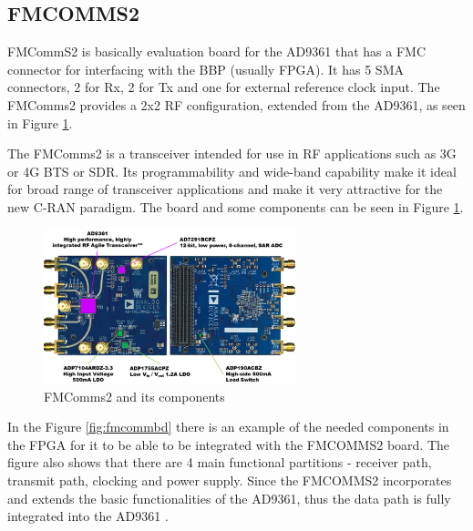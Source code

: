 \subsection{FMCOMMS2}
\label{trans:fmcomms2}

FMCommS2 is basically evaluation board for the AD9361 that has a FMC connector
for interfacing with the BBP (usually FPGA). It has 5 SMA connectors, 2 for Rx,
2 for Tx and one for external reference clock input. The FMComms2 provides a 2x2
RF configuration, extended from the AD9361, as seen in Figure \ref{fig:fmcomm}.

The FMComms2 is a transceiver intended for use in RF applications such  as 3G or
4G BTS or SDR. Its programmability and wide-band capability make it ideal for
broad range of transceiver applications and make it very attractive for the new
C-RAN paradigm. The board and some components can be seen in Figure
\ref{fig:fmcomm}.

\begin{figure}[htbp]
    \centering
    \includegraphics[width=0.65\textwidth]{./figures/fmcomms2_pic}
    \caption{ FMComms2 and its components
    \label{fig:fmcomm}}
\end{figure}




In the Figure \ref{fig:fmcommbd} there is an example of the needed components in
the FPGA for it to be able to be integrated with the FMCOMMS2 board. The figure
also shows that there are 4 main functional partitions - receiver path, transmit
path, clocking and power supply. Since the FMCOMMS2 incorporates and extends the
basic functionalities of the AD9361, thus the data path is fully integrated into
the AD9361 \cite{web:fmcomms2wiki}.

